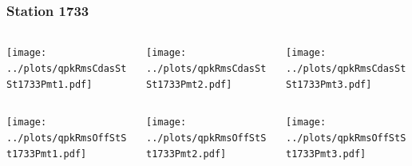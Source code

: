\documentclass[aspectratio=169]{beamer}
\begin{document}
\begin{frame} 
  \frametitle{Station 1733}
  \begin{center}
    \begin{columns}
      \begin{column}{0.33\textwidth}
        \texttt{[image: ../plots/qpkRmsCdasStSt1733Pmt1.pdf]}
      \end{column}
      \begin{column}{0.33\textwidth}
        \texttt{[image: ../plots/qpkRmsCdasStSt1733Pmt2.pdf]}
      \end{column}
      \begin{column}{0.33\textwidth}
        \texttt{[image: ../plots/qpkRmsCdasStSt1733Pmt3.pdf]}
      \end{column}
    \end{columns}
  \end{center}

  \begin{center}
    \begin{columns}
      \begin{column}{0.33\textwidth}
        \texttt{[image: ../plots/qpkRmsOffStSt1733Pmt1.pdf]}
      \end{column}
      \begin{column}{0.33\textwidth}
        \texttt{[image: ../plots/qpkRmsOffStSt1733Pmt2.pdf]}
      \end{column}
      \begin{column}{0.33\textwidth}
        \texttt{[image: ../plots/qpkRmsOffStSt1733Pmt3.pdf]}
      \end{column}
    \end{columns}
  \end{center}
\end{frame}
\end{document}
